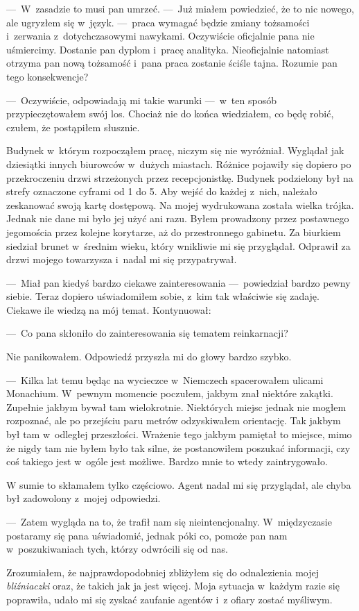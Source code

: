 ---~W~zasadzie to musi pan umrzeć. ---~Już miałem powiedzieć, że to nic nowego, ale ugryzłem się w~język. ---~praca 
wymagać będzie zmiany tożsamości i~zerwania z~dotychczasowymi nawykami. Oczywiście oficjalnie pana nie uśmiercimy. 
Dostanie pan dyplom i~pracę analityka. Nieoficjalnie natomiast otrzyma pan nową tożsamość i~pana praca zostanie 
ściśle tajna. Rozumie pan tego konsekwencje? 

---~Oczywiście, odpowiadają mi takie warunki ---~w~ten sposób przypieczętowałem swój los. Chociaż nie do końca 
wiedziałem, co będę robić, czułem, że postąpiłem słusznie. 

Budynek w~którym rozpocząłem pracę, niczym się nie wyróżniał. Wyglądał jak dziesiątki innych biurowców w~dużych 
miastach. Różnice pojawiły się dopiero po przekroczeniu drzwi strzeżonych przez recepcjonistkę. Budynek podzielony 
był na strefy oznaczone cyframi od 1 do 5. Aby wejść do każdej z~nich, należało zeskanować swoją kartę dostępową. Na 
mojej wydrukowana została wielka trójka. Jednak nie dane mi było jej użyć ani razu. Byłem prowadzony przez postawnego 
jegomościa przez kolejne korytarze, aż do przestronnego gabinetu. Za biurkiem siedział brunet w~średnim wieku, który 
wnikliwie mi się przyglądał. Odprawił za drzwi mojego towarzysza i~nadal mi się przypatrywał. 

---~Miał pan kiedyś bardzo ciekawe zainteresowania ---~powiedział bardzo pewny siebie. Teraz dopiero uświadomiłem 
sobie, z~kim tak właściwie się zadaję. Ciekawe ile wiedzą na mój temat. Kontynuował:

---~Co pana skłoniło do zainteresowania się tematem reinkarnacji? 

Nie panikowałem. Odpowiedź przyszła mi do głowy bardzo szybko. 

---~Kilka lat temu  będąc na wycieczce w~Niemczech spacerowałem ulicami Monachium. W~pewnym momencie poczułem, jakbym 
znał niektóre zakątki. Zupełnie jakbym bywał tam wielokrotnie. Niektórych miejsc jednak nie mogłem rozpoznać, ale po 
przejściu paru metrów odzyskiwałem orientację. Tak jakbym był tam w~odległej przeszłości. Wrażenie tego jakbym 
pamiętał to miejsce, mimo że nigdy tam nie byłem było tak silne, że postanowiłem poszukać informacji, czy coś takiego 
jest w~ogóle jest możliwe. Bardzo mnie to wtedy zaintrygowało.

W sumie to skłamałem tylko częściowo. Agent nadal mi się przyglądał, ale chyba był zadowolony z~mojej odpowiedzi. 

---~Zatem wygląda na to, że trafił nam się nieintencjonalny. W~międzyczasie postaramy się pana uświadomić, jednak 
póki co, pomoże pan nam w~poszukiwaniach tych, którzy odwrócili się od nas. 

Zrozumiałem, że najprawdopodobniej zbliżyłem się do odnalezienia mojej \emph{bliźniaczki} oraz, że takich jak ja jest 
więcej. Moja sytuacja w~każdym razie się poprawiła, udało mi się zyskać zaufanie agentów i~z ofiary zostać myśliwym. 
